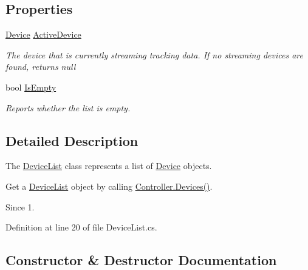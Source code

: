 \subsection*{Properties}
\begin{DoxyCompactItemize}
\item 
\mbox{\hyperlink{class_leap_1_1_device}{Device}} \mbox{\hyperlink{class_leap_1_1_device_list_aaef45b2e7bc5a396c058edf91c02897e}{Active\+Device}}
\begin{DoxyCompactList}\small\item\em The device that is currently streaming tracking data. If no streaming devices are found, returns null \end{DoxyCompactList}\item 
bool \mbox{\hyperlink{class_leap_1_1_device_list_a426d3900c84f918c90e38cb514a53ed4}{Is\+Empty}}
\begin{DoxyCompactList}\small\item\em Reports whether the list is empty. \end{DoxyCompactList}\end{DoxyCompactItemize}


\subsection{Detailed Description}
The \mbox{\hyperlink{class_leap_1_1_device_list}{Device\+List}} class represents a list of \mbox{\hyperlink{class_leap_1_1_device}{Device}} objects. 

Get a \mbox{\hyperlink{class_leap_1_1_device_list}{Device\+List}} object by calling \mbox{\hyperlink{class_leap_1_1_controller_aa5e641f54418e5194161ac45dc15c7fb}{Controller.\+Devices()}}. \begin{DoxySince}{Since}
1. 
\end{DoxySince}


Definition at line 20 of file Device\+List.\+cs.



\subsection{Constructor \& Destructor Documentation}
\mbox{\label{class_leap_1_1_device_list_aa41cad806b6e3b22eed95c6bab9837f8}} 
